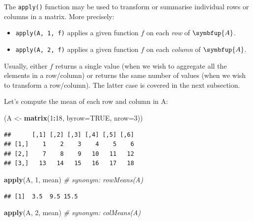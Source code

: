 \documentclass[10pt,b5paper,krantz1]{krantz}
\newenvironment{Shaded}{\begin{snugshade}}{\end{snugshade}}
\newcommand{\CommentTok}[1]{\textcolor[rgb]{0.37,0.37,0.37}{\textit{#1}}}
\newcommand{\DataTypeTok}[1]{\textcolor[rgb]{0.27,0.27,0.27}{#1}}
\newcommand{\DecValTok}[1]{\textcolor[rgb]{0.06,0.06,0.06}{#1}}
\newcommand{\KeywordTok}[1]{\textcolor[rgb]{0.27,0.27,0.27}{\textbf{#1}}}
\newcommand{\NormalTok}[1]{#1}
\newcommand{\OperatorTok}[1]{\textcolor[rgb]{0.43,0.43,0.43}{\textbf{#1}}}
\newcommand{\OtherTok}[1]{\textcolor[rgb]{0.37,0.37,0.37}{#1}}
\newcommand{\StringTok}[1]{\textcolor[rgb]{0.5,0.5,0.5}{#1}}
\providecommand{\tightlist}{%
  \setlength{\itemsep}{0pt}\setlength{\parskip}{0pt}}
\renewcommand{\mathbf}[1]{\symbfup{#1}}
\begin{document}
The \texttt{apply()} function may be used to transform or summarise
individual rows or columns in a matrix. More precisely:

\begin{itemize}
\tightlist
\item
  \texttt{apply(A,\ 1,\ f)} applies a given function \(f\) on each \emph{row} of \(\mathbf{A}\).
\item
  \texttt{apply(A,\ 2,\ f)} applies a given function \(f\) on each \emph{column} of \(\mathbf{A}\).
\end{itemize}

Usually, either \(f\) returns a single value (when we wish to aggregate
all the elements in a row/column) or returns the same number of values
(when we wish to transform a row/column). The latter case is covered in the next
subsection.

Let's compute the mean of each row and column in A:

\begin{Shaded}
\begin{Highlighting}[]
\NormalTok{(A <-}\StringTok{ }\KeywordTok{matrix}\NormalTok{(}\DecValTok{1}\OperatorTok{:}\DecValTok{18}\NormalTok{, }\DataTypeTok{byrow=}\OtherTok{TRUE}\NormalTok{, }\DataTypeTok{nrow=}\DecValTok{3}\NormalTok{))}
\end{Highlighting}
\end{Shaded}

\begin{verbatim}
##      [,1] [,2] [,3] [,4] [,5] [,6]
## [1,]    1    2    3    4    5    6
## [2,]    7    8    9   10   11   12
## [3,]   13   14   15   16   17   18
\end{verbatim}

\begin{Shaded}
\begin{Highlighting}[]
\KeywordTok{apply}\NormalTok{(A, }\DecValTok{1}\NormalTok{, mean) }\CommentTok{# synonym: rowMeans(A)}
\end{Highlighting}
\end{Shaded}

\begin{verbatim}
## [1]  3.5  9.5 15.5
\end{verbatim}

\begin{Shaded}
\begin{Highlighting}[]
\KeywordTok{apply}\NormalTok{(A, }\DecValTok{2}\NormalTok{, mean) }\CommentTok{# synonym: colMeans(A)}
\end{Highlighting}
\end{Shaded}
\end{document}
